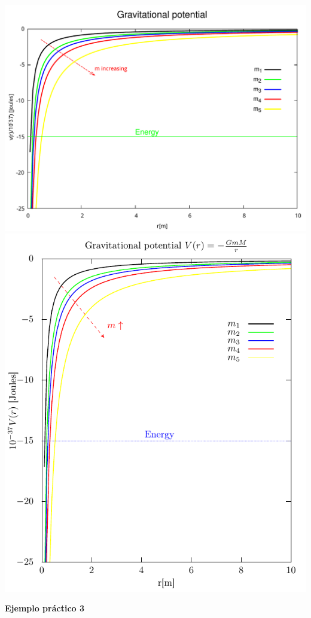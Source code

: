 \documentclass[11.5pt,a4paper]{article}
\begin{document}
\includegraphics[scale=0.35]{ejemplo5.pdf}  
\includegraphics[scale=0.75]{ejemplo6.pdf} 

\textbf{Ejemplo práctico 3}
\end{document}
